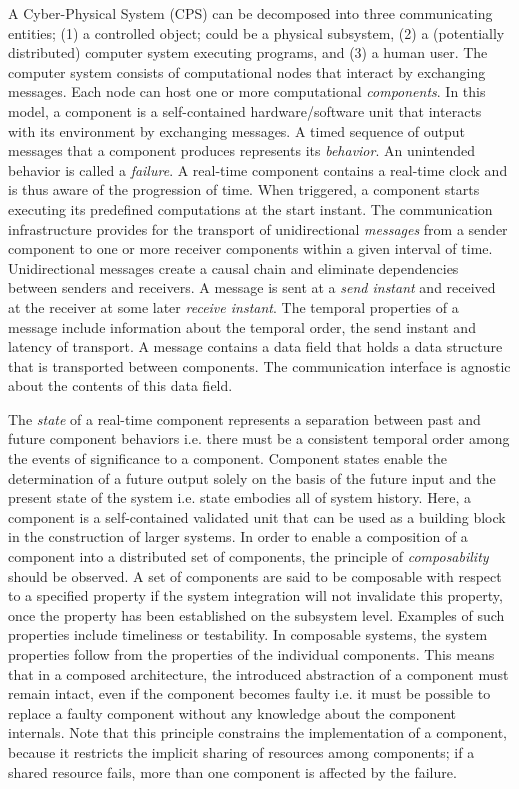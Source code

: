 A Cyber-Physical System (CPS) can be decomposed into three communicating entities; (1) a controlled object; could be a physical subsystem, (2) a (potentially distributed) computer system executing programs, and (3) a human user. The computer system consists of computational nodes that interact by exchanging messages. Each node can host one or more computational \emph{components}. In this model, a component is a self-contained hardware/software unit that interacts with its environment by exchanging messages. A timed sequence of output messages that a component produces represents its \emph{behavior}. An unintended behavior is called a \emph{failure}. A real-time component contains a real-time clock and is thus aware of the progression of time. When triggered, a component starts executing its predefined computations at the start instant.  The communication infrastructure provides for the transport of unidirectional \emph{messages} from a sender component to one or more receiver components within a given interval of time. Unidirectional messages create a causal chain and eliminate dependencies between senders and receivers. A message is sent at a \emph{send instant} and received at the receiver at some later \emph{receive instant}. The temporal properties of a message include information about the temporal order, the send instant and latency of transport. A message contains a data field that holds a data structure that is transported between components. The communication interface is agnostic about the contents of this data field. 

The \emph{state} of a real-time component represents a separation between past and future component behaviors i.e. there must be a consistent temporal order among the events of significance to a component. Component states enable the determination of a future output solely on the basis of the future input and the present state of the system i.e. state embodies all of system history. Here, a component is a self-contained validated unit that can be used as a building block in the construction of larger systems. In order to enable a composition of a component into a distributed set of components, the principle of \emph{composability} should be observed. A set of components are said to be composable with respect to a specified property if the system integration will not invalidate this property, once the property has been established on the subsystem level. Examples of such properties include timeliness or testability. In composable systems, the system properties follow from the properties of the individual components. This means that in a composed architecture, the introduced abstraction of a component must remain intact, even if the component becomes faulty i.e. it must be possible to replace a faulty component without any knowledge about the component internals. Note that this principle constrains the implementation of a component, because it restricts the implicit sharing of resources among components; if a shared resource fails, more than one component is affected by the failure. 

